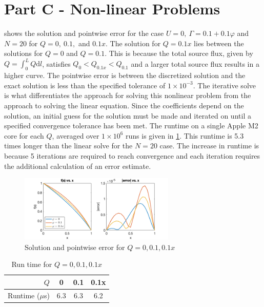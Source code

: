 \documentclass[reqno, 12pt]{article}
\begin{document}
    \section*{Part C - Non-linear Problems}
     shows the solution and pointwise error for the case $U = 0,\ \Gamma = 0.1 + 0.1\varphi$ and $N = 20$ for $Q = 0,\ 0.1,$ and $0.1x$.
    The solution for $Q = 0.1x$ lies between the solutions for $Q = 0$ and $Q = 0.1$.
    This is because the total source flux, given by $Q = \int_{0}^L Q\mathrm{d}l$, satisfies $Q_0 < Q_{0.1x} < Q_{0.1}$ and a larger total source flux results in a higher curve.
    The pointwise error is between the discretized solution and the exact solution is less than the specified tolerance of $1\times 10^{-3}$.
    The iterative solve is what differentiates the approach for solving this nonlinear problem from the approach to solving the linear equation.
    Since the coefficients depend on the solution, an initial guess for the solution must be made and iterated on until a specified convergence tolerance has been met.
    The runtime on a single Apple M2 core for each $Q$, averaged over $1\times 10^6$ runs is given in \cref{tab:c}.
    This runtime is 5.3 times longer than the linear solve for the $N = 20$ case.
    The increase in runtime is because 5 iterations are required to reach convergence and each iteration requires the additional calculation of an error estimate.
    \begin{figure}[h]
        \centering
        \includegraphics[width=0.66\textwidth]{partC.png}
        \caption{Solution and pointwise error for $Q = 0, 0.1, 0.1x$}
        \label{fig:B}
    \end{figure}
    \begin{table}[h]
        \centering
        \caption{Run time for $Q = 0, 0.1, 0.1x$}
        \begin{tabular}{r | c c c}
            $Q$ & 0 & 0.1 & 0.1x \\ \hline
             Runtime ($\mu$s) & 6.3 & 6.3 & 6.2
        \end{tabular}
        \label{tab:c}
    \end{table}
\end{document}
